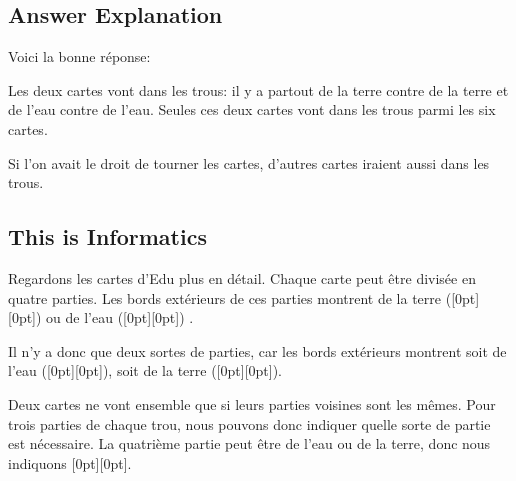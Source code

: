 \documentclass[a4paper,11pt]{report}
\newcommand{\taskGraphicsFolder}{..}
\begin{document}
\endgroup

\subsection*{Answer Explanation}

Voici la bonne réponse:

{\centering%
\par}

Les deux cartes vont dans les trous: il y a partout de la terre contre de la terre et de l’eau contre de l’eau. Seules ces deux cartes vont dans les trous parmi les six cartes.

Si l’on avait le droit de tourner les cartes, d’autres cartes iraient aussi dans les trous.


\subsection*{This is Informatics}

Regardons les cartes d’Edu plus en détail. Chaque carte peut être divisée en quatre parties. Les bords extérieurs de ces parties montrent de la terre (\raisebox{-0.5ex}[0pt][0pt]{}) ou de l’eau (\raisebox{-0.5ex}[0pt][0pt]{}) .

{\centering%
\par}

Il n’y a donc que deux sortes de parties, car les bords extérieurs montrent soit de l’eau (\raisebox{-0.5ex}[0pt][0pt]{}), soit de la terre (\raisebox{-0.5ex}[0pt][0pt]{}).

{\centering%
\par}

Deux cartes ne vont ensemble que si leurs parties voisines sont les mêmes. Pour trois parties de chaque trou, nous pouvons donc indiquer quelle sorte de partie est nécessaire. La quatrième partie peut être de l’eau ou de la terre, donc nous indiquons \raisebox{-0.5ex}[0pt][0pt]{}.
\end{document}
